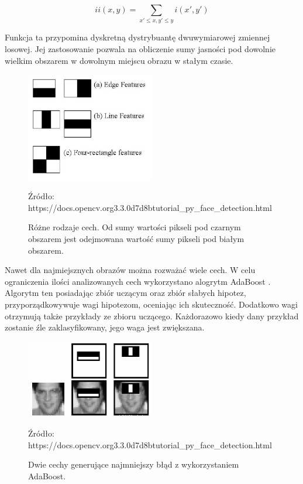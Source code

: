\documentclass[oneside, eng]{mgr}
\begin{document}
\begin{equation}
	ii(x,y) = \sum_{x' \leq x, y' \leq y} i(x',y')
\end{equation}

Funkcja ta przypomina dyskretną dystrybuantę dwuwymiarowej zmiennej losowej. Jej zastosowanie pozwala na obliczenie sumy jasności pod dowolnie wielkim obszarem w dowolnym miejscu obrazu w stałym czasie.

\begin{figure}
\centering
	\includegraphics[width=0.50\textwidth,natwidth=610,natheight=642]{haar_features.jpg}\par\vspace{0.5cm}
\caption{Różne rodzaje cech. Od sumy wartości pikseli pod czarnym obszarem jest odejmowana wartość sumy pikseli pod białym obszarem.}
Źródło: https://docs.opencv.org\/3.3.0\/d7\/d8b\/tutorial\_py\_face\_detection.html
	\label{fig:features}
\end{figure}

Nawet dla najmiejsznych obrazów można rozważać wiele cech. W celu ograniczenia ilości analizowanych cech wykorzystano alogrytm AdaBoost \cite{AdaBoost}. Algorytm ten posiadając zbiór uczącym oraz zbiór słabych hipotez, przyporządkowywuje wagi hipotezom, oceniając ich skuteczność. Dodatkowo wagi otrzymują także przykłady ze zbioru uczącego. Każdorazowo kiedy dany przykład zostanie źle zaklasyfikowany, jego waga jest zwiększana. 


\begin{figure}
\centering
	\includegraphics[width=0.50\textwidth,natwidth=610,natheight=642]{haar.png}\par\vspace{1cm}
\caption{Dwie cechy generujące najmniejszy błąd z wykorzystaniem AdaBoost.}
Źródło: https://docs.opencv.org\/3.3.0\/d7\/d8b\/tutorial\_py\_face\_detection.html
	\label{fig:best_features}
\end{figure}
\end{document}
